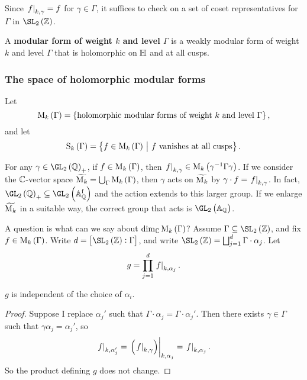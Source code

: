 \begin{note*}
Since $ \left. f \right|_{k, \gamma} = f $ for $ \gamma \in \Gamma $, it suffices to check on a set of coset representatives for $ \Gamma $ in $ \SL_2\br{\ZZ} $.
\end{note*}

\begin{definition}
A \textbf{modular form of weight $ k $ and level $ \Gamma $} is a weakly modular form of weight $ k $ and level $ \Gamma $ that is holomorphic on $ \mathbb{H} $ and at all cusps.
\end{definition}

\pagebreak

\subsubsection{The space of holomorphic modular forms}


Let
$$ \M_k\br{\Gamma} = \cbr{\text{holomorphic modular forms of weight} \ k \ \text{and level} \ \Gamma}, $$
and let
$$ \S_k\br{\Gamma} = \cbr{f \in \M_k\br{\Gamma} \st f \ \text{vanishes at all cusps}}. $$

\begin{note*}
For any $ \gamma \in \GL_2\br{\QQ}_+ $, if $ f \in \M_k\br{\Gamma} $, then $ \eval{f}_{k, \gamma} \in \M_k\br{\gamma^{-1}\Gamma\gamma} $. If we consider the $ \mathbb{C} $-vector space $ \widetilde{\M_k} = \bigcup_\Gamma \M_k\br{\Gamma} $, then $ \gamma $ acts on $ \widetilde{\mathrm{M}_k} $ by $ \gamma \cdot f = \left. f \right|_{k, \gamma} $. In fact, $ \GL_2\br{\QQ}_+ \subseteq \GL_2\br{\AA_\QQ^\f} $ and the action extends to this larger group. If we enlarge $ \widetilde{\mathrm{M}_k} $ in a suitable way, the correct group that acts is $ \GL_2\br{\AA_\QQ} $.
\end{note*}

A question is what can we say about $ \dim_\CC \M_k\br{\Gamma} $? Assume $ \Gamma \subseteq \SL_2\br{\ZZ} $, and fix $ f \in \M_k\br{\Gamma} $. Write $ d = \sbr{\SL_2\br{\ZZ} : \Gamma} $, and write $ \SL_2\br{\ZZ} = \bigsqcup_{j = 1}^d \Gamma \cdot \alpha_j $. Let
$$ g = \prod_{j = 1}^d \left. f \right|_{k, \alpha_j}. $$

\begin{proposition}
$ g $ is independent of the choice of $ \alpha_i $.
\end{proposition}

\begin{proof}
Suppose I replace $ \alpha_j' $ such that $ \Gamma \cdot \alpha_j = \Gamma \cdot \alpha_j' $. Then there exists $ \gamma \in \Gamma $ such that $ \gamma\alpha_j = \alpha_j' $, so
$$ \eval{f}_{k, \alpha_j'} = \eval{\br{\eval{f}_{k, \gamma}}}_{k, \alpha_j} = \eval{f}_{k, \alpha_j}. $$
So the product defining $ g $ does not change.
\end{proof}

